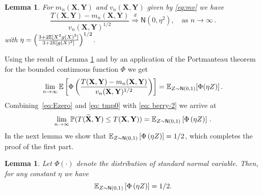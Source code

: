 \documentclass[11pt]{article}
\newtheorem{lemma}[propo]{Lemma}
\def\bX{\mathbf{X}}
\def\bY{\mathbf{Y}}
\def\normal{\mathsf{N}}
\def\tbX{\widetilde{\bX}}
\begin{document}
\begin{lemma}\label{lemma:crt-failure-1}
 For $m_n(\bX,\bY)$ and $v_n(\bX,\bY)$ given by \eqref{eq:mv} we have
\[
 \frac{T(\bX,\bY)- m_n(\bX,\bY)}{ v_n(\bX,\bY)^{1/2} } \overset{d}{\Rightarrow} \normal(0,\eta^2), \quad \text{as } n \rightarrow \infty\,.
\]
with  $\eta=\left(\frac{3+2{\mathbb E}[X^2g(X)^2]}{3+2{\mathbb E}[g(X)^2]}\right)^{1/2} $.
\end{lemma}
%
Using the result of Lemma \ref{lemma:crt-failure-1} and by an application of the Portmanteau theorem for the bounded continuous function $\Phi$ we get 
\begin{equation}\label{eq: tmp0}
\lim\limits_{n\rightarrow \infty}^{}  \E \left[ \Phi\left(   \frac{T(\bX,\bY)- m_n(\bX,\bY)}{ v_n(\bX,\bY)^{1/2} }  \right) \right]=\E_{Z\sim \normal(0,1)}[\Phi(\eta Z)]\,.
\end{equation}
Combining~\eqref{eq:Ezero} and \eqref{eq: tmp0} with \eqref{eq: berry-2} we arrive at
\[
\lim_{n\to\infty}\prob(T(\tbX,\bY)\leq T(\bX,\bY))=\E_{Z\sim \normal(0,1)}\left[\Phi\left(\eta Z\right) \right] \,.
\]
%
%
In the next lemma we show that $\E_{Z\sim \normal(0,1)}\left[\Phi\left(\eta Z\right) \right] = 1/2$, which completes the proof of the first part.
\begin{lemma}\label{lem:phi-etaZ}
Let $\Phi(\cdot)$ denote the distribution of standard normal variable. Then, for any constant $\eta$ we have
\[
\E_{Z\sim \normal(0,1)}\left[\Phi\left(\eta Z\right) \right] = 1/2.
\]
\end{lemma}
\end{document}
